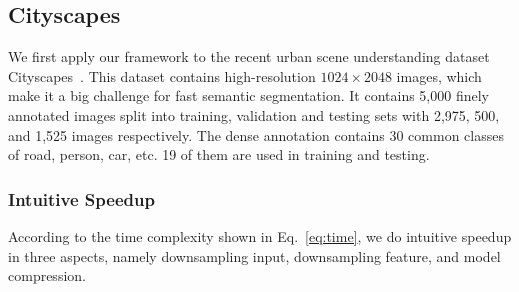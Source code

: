 \documentclass[runningheads]{llncs}
\begin{document}
\subsection{Cityscapes}
We first apply our framework to the recent urban scene understanding dataset Cityscapes~\cite{cordts2016cityscapes}. This dataset contains high-resolution $1024 \times 2048$ images, which make it a big challenge for fast semantic segmentation. It contains 5,000 finely annotated images split into training, validation and testing sets with 2,975, 500, and 1,525 images respectively. The dense annotation contains 30 common classes of road, person, car, etc. 19 of them are used in training and testing.

\subsubsection{Intuitive Speedup}
According to the time complexity shown in Eq.~\eqref{eq:time}, we do intuitive speedup in three aspects, namely downsampling input, downsampling feature, and model compression.
\end{document}
